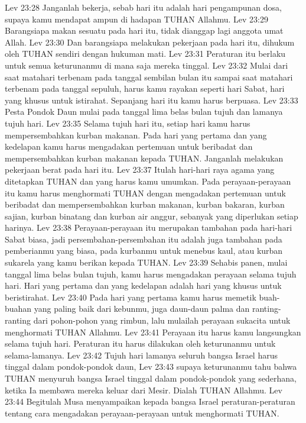 Lev 23:28  Janganlah bekerja, sebab hari itu adalah hari pengampunan dosa, supaya kamu mendapat ampun di hadapan TUHAN Allahmu.
Lev 23:29  Barangsiapa makan sesuatu pada hari itu, tidak dianggap lagi anggota umat Allah.
Lev 23:30  Dan barangsiapa melakukan pekerjaan pada hari itu, dihukum oleh TUHAN sendiri dengan hukuman mati.
Lev 23:31  Peraturan itu berlaku untuk semua keturunanmu di mana saja mereka tinggal.
Lev 23:32  Mulai dari saat matahari terbenam pada tanggal sembilan bulan itu sampai saat matahari terbenam pada tanggal sepuluh, harus kamu rayakan seperti hari Sabat, hari yang khusus untuk istirahat. Sepanjang hari itu kamu harus berpuasa.
Lev 23:33  Pesta Pondok Daun mulai pada tanggal lima belas bulan tujuh dan lamanya tujuh hari.
Lev 23:35  Selama tujuh hari itu, setiap hari kamu harus mempersembahkan kurban makanan. Pada hari yang pertama dan yang kedelapan kamu harus mengadakan pertemuan untuk beribadat dan mempersembahkan kurban makanan kepada TUHAN. Janganlah melakukan pekerjaan berat pada hari itu.
Lev 23:37  Itulah hari-hari raya agama yang ditetapkan TUHAN dan yang harus kamu umumkan. Pada perayaan-perayaan itu kamu harus menghormati TUHAN dengan mengadakan pertemuan untuk beribadat dan mempersembahkan kurban makanan, kurban bakaran, kurban sajian, kurban binatang dan kurban air anggur, sebanyak yang diperlukan setiap harinya.
Lev 23:38  Perayaan-perayaan itu merupakan tambahan pada hari-hari Sabat biasa, jadi persembahan-persembahan itu adalah juga tambahan pada pemberianmu yang biasa, pada kurbanmu untuk menebus kaul, atau kurban sukarela yang kamu berikan kepada TUHAN.
Lev 23:39  Sehabis panen, mulai tanggal lima belas bulan tujuh, kamu harus mengadakan perayaan selama tujuh hari. Hari yang pertama dan yang kedelapan adalah hari yang khusus untuk beristirahat.
Lev 23:40  Pada hari yang pertama kamu harus memetik buah-buahan yang paling baik dari kebunmu, juga daun-daun palma dan ranting-ranting dari pohon-pohon yang rimbun, lalu mulailah perayaan sukacita untuk menghormati TUHAN Allahmu.
Lev 23:41  Perayaan itu harus kamu langsungkan selama tujuh hari. Peraturan itu harus dilakukan oleh keturunanmu untuk selama-lamanya.
Lev 23:42  Tujuh hari lamanya seluruh bangsa Israel harus tinggal dalam pondok-pondok daun,
Lev 23:43  supaya keturunanmu tahu bahwa TUHAN menyuruh bangsa Israel tinggal dalam pondok-pondok yang sederhana, ketika Ia membawa mereka keluar dari Mesir. Dialah TUHAN Allahmu.
Lev 23:44  Begitulah Musa menyampaikan kepada bangsa Israel peraturan-peraturan tentang cara mengadakan perayaan-perayaan untuk menghormati TUHAN.
